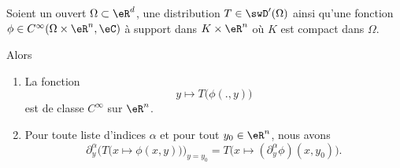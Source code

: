 \begin{proposition}     \label{PROPooCNYTooWCKHpV}
    Soient un ouvert \( \Omega\subset \eR^d\), une distribution \( T\in \swD'(\Omega)\) ainsi qu'une fonction \( \phi\in C^{\infty}(\Omega\times \eR^n,\eC)\) à support dans \( K\times \eR^n\) où \( K\) est compact dans \( \Omega\).

    Alors
    \begin{enumerate}
        \item       \label{ITEMooBIVOooHwGglM}
            La fonction
            \begin{equation}
                y\mapsto T\big( \phi(.,y) \big)
            \end{equation}
            est de classe \(  C^{\infty}\) sur \( \eR^n\).
        \item
            Pour toute liste d'indices \( \alpha\) et pour tout \( y_0\in \eR^n\), nous avons
            \begin{equation}        \label{EQooYMXXooYkceTv}
\partial_y^{\alpha}\big( T\big( x\mapsto \phi(x,y) \big) \big)_{y=y_0}= T\big( x\mapsto(\partial_{y}^{\alpha}\phi)(x,y_0) \big).
            \end{equation}
    \end{enumerate}
\end{proposition}

